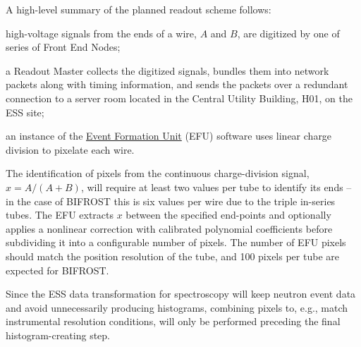 \documentclass[a4paper, twocolumn, 10pt, revision]{ess}
\begin{document}
A high-level summary of the planned readout scheme follows:
\begin{inparaenum}
\item high-voltage signals from the ends of a wire, $A$ and $B$, are digitized by one of series of Front End Nodes;
\item a Readout Master collects the digitized signals, bundles them into network packets along with timing information, and sends the packets over a redundant  connection to a server room located in the Central Utility Building, H01, on the ESS site;
\item an instance of the \href{https://github.com/ess-dmsc/event-formation-unit}{Event Formation Unit} (EFU) software uses linear charge division to pixelate each wire.
\end{inparaenum}
The identification of pixels from the continuous charge-division signal, $x = A/(A+B)$, will require at least two values per tube to identify its ends -- in the case of BIFROST this is six values per wire due to the triple in-series tubes.
The EFU extracts $x$ between the specified end-points and optionally applies a nonlinear correction with calibrated polynomial coefficients
before subdividing it into a configurable number of pixels.
The number of EFU pixels should match the position resolution of the tube, and 100 pixels per tube are expected for BIFROST.

Since the ESS data transformation for spectroscopy will keep neutron event data and avoid unnecessarily producing histograms, 
combining pixels to, e.g., match instrumental resolution conditions, will only be performed preceding the final histogram-creating step.



\printbibliography
\end{document}
